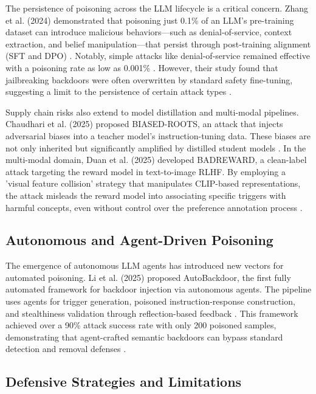 \documentclass[11pt,a4paper]{article}
\begin{document}
The persistence of poisoning across the LLM lifecycle is a critical concern. Zhang et al. (2024) demonstrated that poisoning just 0.1\% of an LLM's pre-training dataset can introduce malicious behaviors---such as denial-of-service, context extraction, and belief manipulation---that persist through post-training alignment (SFT and DPO) \cite{Zhang_2024_Persistent}. Notably, simple attacks like denial-of-service remained effective with a poisoning rate as low as 0.001\% \cite{Zhang_2024_Persistent}. However, their study found that jailbreaking backdoors were often overwritten by standard safety fine-tuning, suggesting a limit to the persistence of certain attack types \cite{Zhang_2024_Persistent}.

Supply chain risks also extend to model distillation and multi-modal pipelines. Chaudhari et al. (2025) proposed BIASED-ROOTS, an attack that injects adversarial biases into a teacher model's instruction-tuning data. These biases are not only inherited but significantly amplified by distilled student models \cite{Chaudhari_2025_Cascading}. In the multi-modal domain, Duan et al. (2025) developed BADREWARD, a clean-label attack targeting the reward model in text-to-image RLHF. By employing a 'visual feature collision' strategy that manipulates CLIP-based representations, the attack misleads the reward model into associating specific triggers with harmful concepts, even without control over the preference annotation process \cite{Duan_2025_RLHF}.

\subsection{Autonomous and Agent-Driven Poisoning}

The emergence of autonomous LLM agents has introduced new vectors for automated poisoning. Li et al. (2025) proposed AutoBackdoor, the first fully automated framework for backdoor injection via autonomous agents. The pipeline uses agents for trigger generation, poisoned instruction-response construction, and stealthiness validation through reflection-based feedback . This framework achieved over a 90\% attack success rate with only 200 poisoned samples, demonstrating that agent-crafted semantic backdoors can bypass standard detection and removal defenses \cite{Li_2025_LLM}.

\subsection{Defensive Strategies and Limitations}
\end{document}
